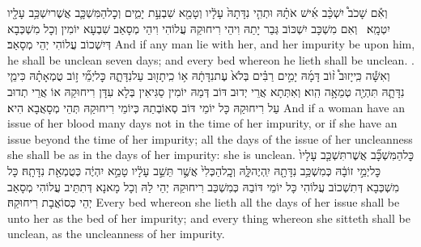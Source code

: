 {וְאִ֡ם שָׁכֹב֩ יִשְׁכַּ֨ב אִ֜ישׁ אֹתָ֗הּ וּתְהִ֤י נִדָּתָהּ֙ עָלָ֔יו וְטָמֵ֖א שִׁבְעַ֣ת יָמִ֑ים וְכׇל\maqqaf הַמִּשְׁכָּ֛ב אֲשֶׁר\maqqaf יִשְׁכַּ֥ב עָלָ֖יו יִטְמָֽא׃ \setuma }
{וְאִם מִשְׁכָּב יִשְׁכּוֹב גְּבַר יָתַהּ וִיהֵי רִיחוּקַהּ עֲלוֹהִי וִיהֵי מְסָאַב שִׁבְעָא יוֹמִין וְכָל מִשְׁכְּבָא דְּיִשְׁכוֹב עֲלוֹהִי יְהֵי מְסָאַב׃}
{And if any man lie with her, and her impurity be upon him, he shall be unclean seven days; and every bed whereon he lieth shall be unclean. .}{}
{וְאִשָּׁ֡ה כִּֽי\maqqaf יָזוּב֩ ז֨וֹב דָּמָ֜הּ יָמִ֣ים רַבִּ֗ים בְּלֹא֙ עֶת\maqqaf נִדָּתָ֔הּ א֥וֹ כִֽי\maqqaf תָז֖וּב עַל\maqqaf נִדָּתָ֑הּ כׇּל\maqqaf יְמֵ֞י ז֣וֹב טֻמְאָתָ֗הּ כִּימֵ֧י נִדָּתָ֛הּ תִּהְיֶ֖ה טְמֵאָ֥ה הִֽוא׃}
{וְאִתְּתָא אֲרֵי יְדוּב דּוֹב דְּמַהּ יוֹמִין סַגִּיאִין בְּלָא עִדָּן רִיחוּקַהּ אוֹ אֲרֵי תְדוּב עַל רִיחוּקַהּ כָּל יוֹמֵי דּוֹב סְאוֹבְתַהּ כְּיוֹמֵי רִיחוּקַהּ תְּהֵי מְסָאֲבָא הִיא׃}
{And if a woman have an issue of her blood many days not in the time of her impurity, or if she have an issue beyond the time of her impurity; all the days of the issue of her uncleanness she shall be as in the days of her impurity: she is unclean.}{}
{כׇּל\maqqaf הַמִּשְׁכָּ֞ב אֲשֶׁר\maqqaf תִּשְׁכַּ֤ב עָלָיו֙ כׇּל\maqqaf יְמֵ֣י זוֹבָ֔הּ כְּמִשְׁכַּ֥ב נִדָּתָ֖הּ יִֽהְיֶה\maqqaf לָּ֑הּ וְכׇֽל\maqqaf הַכְּלִי֙ אֲשֶׁ֣ר תֵּשֵׁ֣ב עָלָ֔יו טָמֵ֣א יִהְיֶ֔ה כְּטֻמְאַ֖ת נִדָּתָֽהּ׃}
{כָּל מִשְׁכְּבָא דְּתִשְׁכוֹב עֲלוֹהִי כָּל יוֹמֵי דּוֹבַהּ כְּמִשְׁכַּב רִיחוּקַהּ יְהֵי לַהּ וְכָל מָאנָא דְּתִתֵּיב עֲלוֹהִי מְסָאַב יְהֵי כְּסוֹאֲבָת רִיחוּקַהּ׃}
{Every bed whereon she lieth all the days of her issue shall be unto her as the bed of her impurity; and every thing whereon she sitteth shall be unclean, as the uncleanness of her impurity.}{}
